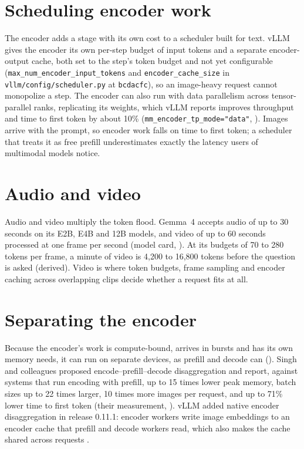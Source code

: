 \section{Scheduling encoder work}

The encoder adds a stage with its own cost to a scheduler built for text.
vLLM gives the encoder its own per-step budget of input tokens and a separate
encoder-output cache, both set to the step's token budget and not yet
configurable (\texttt{max\_num\_encoder\_input\_tokens} and
\texttt{encoder\_cache\_size} in \texttt{vllm/config/scheduler.py} at
\texttt{bcdacfc}), so an image-heavy request cannot monopolize a step. The encoder can also run with data
parallelism across tensor-parallel ranks, replicating its weights, which vLLM
reports improves throughput and time to first token by about 10\%
(\texttt{mm\_encoder\_tp\_mode="data"}, \cite{vllm2026optimization}). Images
arrive with the prompt, so encoder work falls on time to first token; a
scheduler that treats it as free prefill underestimates exactly the latency
users of multimodal models notice.

\section{Audio and video}

Audio and video multiply the token flood. Gemma~4 accepts audio of up to 30
seconds on its E2B, E4B and 12B models, and video of up to 60 seconds processed
at one frame per second (model card, \cite{google2026gemma4}). At its budgets
of 70 to 280 tokens per frame, a minute of video is 4,200 to 16,800 tokens
before the question is asked (derived). Video is where token budgets, frame
sampling and encoder caching across overlapping clips decide whether a request
fits at all.

\section{Separating the encoder}

Because the encoder's work is compute-bound, arrives in bursts and has its own
memory needs, it can run on separate devices, as prefill and decode can
(). Singh and colleagues proposed
encode--prefill--decode disaggregation and report, against systems that run
encoding with prefill, up to 15 times lower peak memory, batch sizes up to 22
times larger, 10 times more images per request, and up to 71\% lower time to
first token (their measurement, \cite{singh2025epd}). vLLM added native encoder
disaggregation in release 0.11.1: encoder workers write image embeddings to an
encoder cache that prefill and decode workers read, which also makes the cache
shared across requests \cite{vllm2025epd}.


